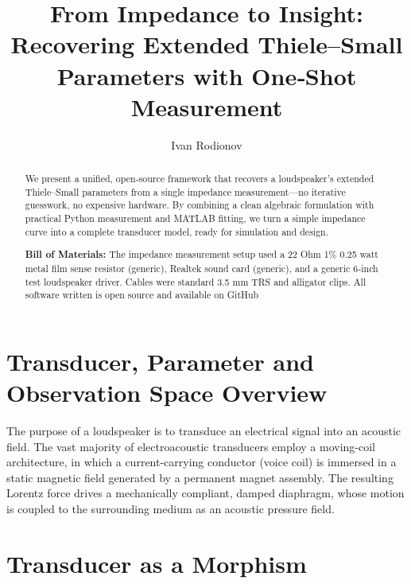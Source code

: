 \usepackage{tcolorbox}

\usepackage{circuitikz}
\usepackage{graphicx}

\title{From Impedance to Insight: Recovering Extended Thiele–Small Parameters with One‑Shot Measurement}
\date{}
\author{Ivan Rodionov}




\maketitle

\begin{abstract}
\noindent We present a unified, open‑source framework that recovers a loudspeaker’s extended Thiele–Small parameters from a single impedance measurement—no iterative guesswork, no expensive hardware. By combining a clean algebraic formulation with practical Python measurement and MATLAB fitting, we turn a simple impedance curve into a complete transducer model, ready for simulation and design.

\vspace{5mm}
\noindent \textbf{Bill of Materials:} The impedance measurement setup used a 22 Ohm 1\% 0.25 watt metal film sense resistor (generic), Realtek sound card (generic), and a generic 6‑inch test loudspeaker driver. Cables were standard 3.5 mm TRS and alligator clips. All software written is open source and available on GitHub

\end{abstract}



\newpage

\section{Transducer, Parameter and Observation Space Overview}
The purpose of a loudspeaker is to transduce an electrical signal into an acoustic field. The vast majority of electroacoustic transducers employ a moving-coil architecture, in which a current-carrying conductor (voice coil) is immersed in a static magnetic field generated by a permanent magnet assembly. The resulting Lorentz force drives a mechanically compliant, damped diaphragm, whose motion is coupled to the surrounding medium as an acoustic pressure field.

\section*{Transducer as a Morphism}


